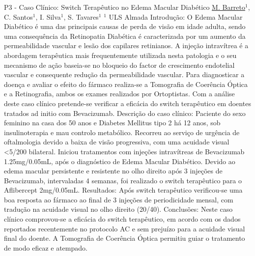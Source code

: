 
    \begin{abstract_online}{P3 - Caso Clínico: Switch Terapêutico no Edema Macular Diabético}{%
        \underline{M. Barreto}$^{1}$, C. Santos$^{1}$, I. Silva$^{1}$, S. Tavares$^{1}$}{%
        }{%
        $^1$ ULS Almada \newline{}}
        Introdução: O Edema Macular Diabético é uma das principais causas de perda de visão em idade adulta, sendo uma consequência da Retinopatia Diabética é caracterizada por um aumento da permeabilidade vascular e lesão dos capilares retinianos. A injeção intravítrea é a abordagem terapêutica mais frequentemente utilizada nesta patologia e o seu mecanismo de ação baseia-se no bloqueio do factor de crescimento endotelial vascular e consequente redução da permeabilidade vascular. Para diagnosticar a doença e avaliar o efeito do fármaco realiza-se a Tomografia de Coerência Óptica e a Retinografia, ambos os exames realizados por Ortoptistas. Com a análise deste caso clínico pretende-se verificar a eficácia do switch terapêutico em doentes tratados ad initio com Bevacizumab.\newline{}
        Descrição do caso clínico: Paciente do sexo feminino na casa dos 50 anos e Diabetes Mellitus tipo 2 há 12 anos, sob insulinoterapia e mau controlo metabólico. Recorreu ao serviço de urgência de oftalmologia devido a baixa de visão progressiva, com uma acuidade visual <5/200 bilateral. Iniciou tratamentos com injeções intravítreas de Bevacizumab 1.25mg/0.05mL, após o diagnóstico de Edema Macular Diabético. Devido ao edema macular persistente e resistente no olho direito após 3 injeções de Bevacizumab, intervaladas 4 semanas, foi realizado o switch terapêutico para o Aflibercept 2mg/0.05mL.\newline{}
        Resultados: Após switch terapêutico verificou-se uma boa resposta ao fármaco ao final de 3 injeções de periodicidade mensal, com tradução na acuidade visual no olho direito (20/40). Conclusões: Neste caso clínico comprovou-se a eficácia do switch terapêutico, em acordo com os dados reportados recentemente no protocolo AC e sem prejuízo para a acuidade visual final do doente. A Tomografia de Coerência Óptica permitiu guiar o tratamento de modo eficaz e atempado.
    \end{abstract_online}
    